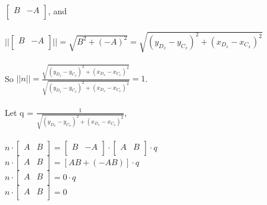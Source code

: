 \documentclass[12pt]{article}
\begin{document}
  $\begin{bmatrix}
  B & -A\\
  \end{bmatrix}$, and\\
  \\
  \indent
  $||\begin{bmatrix}
  B & -A\\
  \end{bmatrix}|| = \sqrt{B^2+(-A)^2} = \sqrt{(y_{D_x}-y_{C_x})^2+(x_{D_x}-x_{C_x})^2}$\\
  \\
  So $|| n || =  \frac{\sqrt{(y_{D_x}-y_{C_x})^2+(x_{D_x}-x_{C_x})^2}}{\sqrt{(y_{D_x}-y_{C_x})^2+(x_{D_x}-x_{C_x})^2}} = 1$.\\
  \\
  Let q = $\frac{1}{\sqrt{(y_{D_x}-y_{C_x})^2+(x_{D_x}-x_{C_x})^2}}$,
  \\
  \\
  \indent
  $n \cdot \begin{bmatrix}
  A & B\\
  \end{bmatrix} = \begin{bmatrix}
  B & -A\\
  \end{bmatrix} \cdot \begin{bmatrix}
  A & B\\
  \end{bmatrix} \cdot q$
  \\
  \indent
  $n \cdot \begin{bmatrix}
  A & B\\
  \end{bmatrix} = [AB + (-AB)] \cdot q$
  \\
  \indent
  $n \cdot \begin{bmatrix}
  A & B\\
  \end{bmatrix} = 0 \cdot q$
  \\
  \indent
  $n \cdot \begin{bmatrix}
  A & B\\
  \end{bmatrix} = 0$
  \\
  
\end{document}
